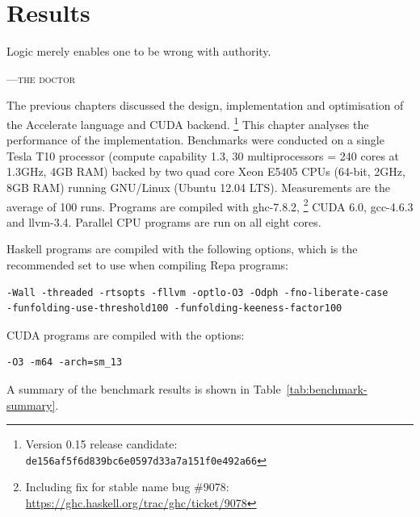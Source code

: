 %
%

\chapter{Results}
\label{ch:results}

\epigraph{Logic merely enables one to be wrong with authority.}%
{\textsc{---the doctor}} %




The previous chapters discussed the design, implementation and optimisation of
the Accelerate language and CUDA backend.%
\footnote{Version 0.15 release candidate: \texttt{de156af5f6d839bc6e0597d33a7a151f0e492a66}}
This chapter analyses the performance of the implementation. Benchmarks were
conducted on a single Tesla T10 processor (compute capability 1.3, 30
multiprocessors = 240 cores at 1.3GHz, 4GB RAM) backed by two quad core Xeon
E5405 CPUs (64-bit, 2GHz, 8GB RAM) running GNU/Linux (Ubuntu 12.04 LTS).
Measurements are the average of 100 runs. Programs are compiled with
ghc-7.8.2,%
\footnote{Including fix for stable name bug \#9078: \url{https://ghc.haskell.org/trac/ghc/ticket/9078}}
CUDA 6.0, gcc-4.6.3 and llvm-3.4. Parallel CPU programs are run on all eight
cores.

Haskell programs are compiled with the following options, which is the
recommended set to use when compiling Repa programs:
%
\begin{lstlisting}
-Wall -threaded -rtsopts -fllvm -optlo-O3 -Odph -fno-liberate-case
-funfolding-use-threshold100 -funfolding-keeness-factor100
\end{lstlisting}
%
CUDA programs are compiled with the options:
%
\begin{lstlisting}
-O3 -m64 -arch=sm_13
\end{lstlisting}
%
A summary of the benchmark results is shown in
Table~\ref{tab:benchmark-summary}.

